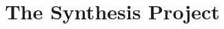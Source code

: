 \documentclass[11pt]{article}
\begin{document}
\ttfamily
\title{The Synthesis Project}
\maketitle
\end{document}
